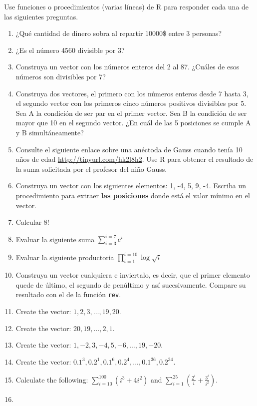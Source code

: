 \documentclass[10pt,]{krantz}
\providecommand{\tightlist}{%
  \setlength{\itemsep}{0pt}\setlength{\parskip}{0pt}}
\begin{document}
Use funciones o procedimientos (varias líneas) de R para responder cada
una de las siguientes preguntas.

\begin{enumerate}
\def\labelenumi{\arabic{enumi}.}
\tightlist
\item
  ¿Qué cantidad de dinero sobra al repartir 10000\$ entre 3 personas?
\item
  ¿Es el número 4560 divisible por 3?
\item
  Construya un vector con los números enteros del 2 al 87. ¿Cuáles de
  esos números son divisibles por 7?
\item
  Construya dos vectores, el primero con los números enteros desde 7
  hasta 3, el segundo vector con los primeros cinco números positivos
  divisibles por 5. Sea A la condición de ser par en el primer vector.
  Sea B la condición de ser mayor que 10 en el segundo vector. ¿En cuál
  de las 5 posiciones se cumple A y B simultáneamente?
\item
  Consulte el siguiente enlace sobre una anéctoda de Gauss cuando tenía
  10 años de edad \url{http://tinyurl.com/hk2l8h2}. Use R para obtener
  el resultado de la suma solicitada por el profesor del niño Gauss.
\item
  Construya un vector con los siguientes elementos: 1, -4, 5, 9, -4.
  Escriba un procedimiento para extraer \textbf{las posiciones} donde
  está el valor mínimo en el vector.
\item
  Calcular \(8!\)
\item
  Evaluar la siguiente suma \(\sum_{i=3}^{i=7}e^i\)
\item
  Evaluar la siguiente productoria \(\prod_{i=1}^{i=10}\log\sqrt{i}\)
\item
  Construya un vector cualquiera e inviertalo, es decir, que el primer
  elemento quede de último, el segundo de penúltimo y así sucesivamente.
  Compare su resultado con el de la función \texttt{rev}.
\item
  Create the vector: \(1, 2, 3, \ldots, 19, 20\).
\item
  Create the vector: \(20, 19, \ldots , 2, 1\).
\item
  Create the vector: \(1, -2, 3, -4, 5, -6, \ldots, 19, -20\).
\item
  Create the vector:
  \(0.1^3, 0.2^1, 0.1^6, 0.2^4, . . . , 0.1^{36}, 0.2^{34}\).
\item
  Calculate the following: \(\sum_{i=10}^{100}(i^3+4i^2)\) and
  \(\sum_{i=1}^{25}\left( \frac{2^i}{i} + \frac{3^i}{i^2} \right)\).
\item

\end{enumerate}
\end{document}
